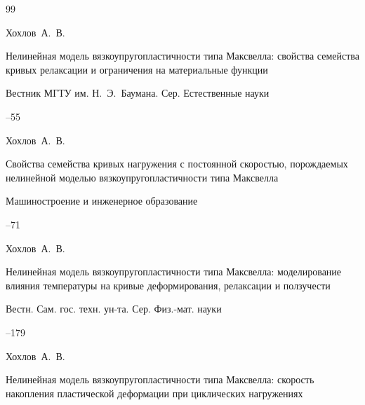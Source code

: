 \begin{thebibliography}{99}






\by Хохлов~А.~В.

\paper Нелинейная модель вязкоупругопластичности типа Максвелла: свойства семейства кривых релаксации и ограничения на материальные функции

\jour Вестник МГТУ им. Н.~Э.~Баумана. Сер. Естественные науки



--55







\by Хохлов~А.~В.

\paper Свойства семейства кривых нагружения с постоянной скоростью, порождаемых нелинейной моделью вязкоупругопластичности типа Максвелла

\jour Машиностроение и инженерное образование



--71







\by Хохлов~А.~В.

\paper Нелинейная модель вязкоупругопластичности типа Максвелла: моделирование влияния температуры на кривые деформирования, релаксации и ползучести

\jour Вестн. Сам. гос. техн. ун-та. Сер. Физ.-мат. науки




--179







\by Хохлов~А.~В.

\paper Нелинейная модель вязкоупругопластичности типа Максвелла: скорость накопления пластической деформации при циклических нагружениях


\end{thebibliography}
